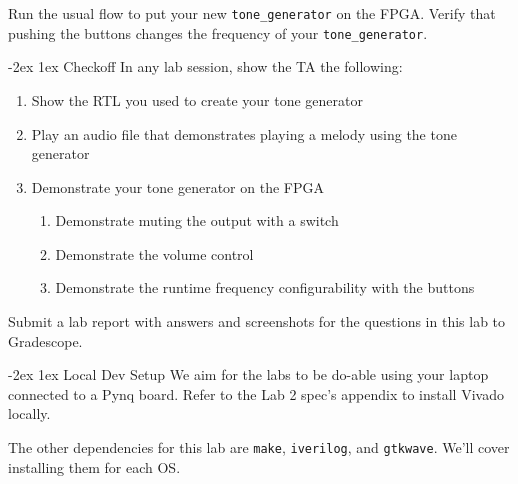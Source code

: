 \documentclass[11pt]{article}
\makeatletter
\renewcommand{\section}
{\@startsection {section}{1}{0pt}
 {-2ex}
 {1ex}
 {\bfseries\Large}}
\makeatother
\begin{document}
Run the usual flow to put your new \verb|tone_generator| on the FPGA.
Verify that pushing the buttons changes the frequency of your \verb|tone_generator|.

\section{Checkoff}
In any lab session, show the TA the following:
\begin{enumerate}
  \item Show the RTL you used to create your tone generator
  \item Play an audio file that demonstrates playing a melody using the tone generator
  \item Demonstrate your tone generator on the FPGA
    \begin{enumerate}
      \item Demonstrate muting the output with a switch
      \item Demonstrate the volume control
      \item Demonstrate the runtime frequency configurability with the buttons
    \end{enumerate}
\end{enumerate}

Submit a lab report with answers and screenshots for the questions in this lab to Gradescope.

\appendix
\section{Local Dev Setup}
We aim for the labs to be do-able using your laptop connected to a Pynq board.
Refer to the Lab 2 spec's appendix to install Vivado locally.

The other dependencies for this lab are \verb|make|, \verb|iverilog|, and \verb|gtkwave|.
We'll cover installing them for each OS.
\end{document}
